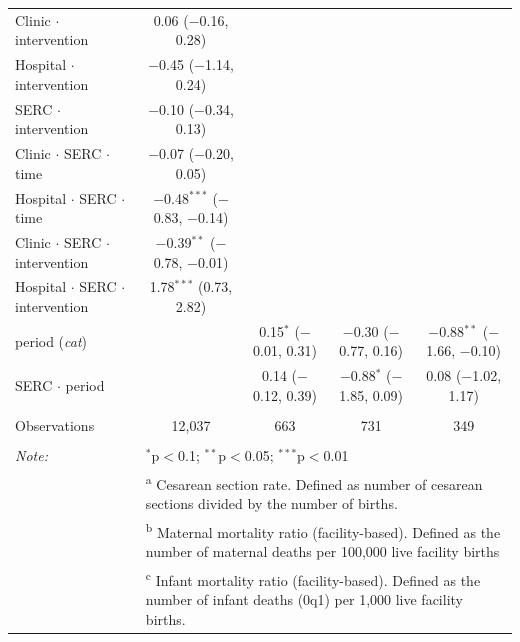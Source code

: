 \documentclass[10pt]{article}
\begin{document}
\begin{table}
\begin{tabular}{@{\extracolsep{0pt}}lcccc}
  Clinic $\cdot$ intervention & 0.06 ($-$0.16, 0.28) &  &  &  \\ 
  Hospital $\cdot$ intervention & $-$0.45 ($-$1.14, 0.24) &  &  &  \\ 
  SERC $\cdot$ intervention & $-$0.10 ($-$0.34, 0.13) &  &  &  \\ 
  Clinic $\cdot$ SERC $\cdot$ time & $-$0.07 ($-$0.20, 0.05) &  &  &  \\ 
  Hospital $\cdot$ SERC $\cdot$ time & $-$0.48$^{***}$ ($-$0.83, $-$0.14) &  &  &  \\ 
  Clinic $\cdot$ SERC $\cdot$ intervention & $-$0.39$^{**}$ ($-$0.78, $-$0.01) &  &  &  \\ 
  Hospital $\cdot$ SERC $\cdot$ intervention & 1.78$^{***}$ (0.73, 2.82) &  &  &  \\ 
  period (\textit{cat}) &  & 0.15$^{*}$ ($-$0.01, 0.31) & $-$0.30 ($-$0.77, 0.16) & $-$0.88$^{**}$ ($-$1.66, $-$0.10) \\ 
  SERC $\cdot$ period &  & 0.14 ($-$0.12, 0.39) & $-$0.88$^{*}$ ($-$1.85, 0.09) & 0.08 ($-$1.02, 1.17) \\ 
 \hline \\[-1.8ex] 
Observations & 12,037 & 663 & 731 & 349 \\ 
\hline 
\hline \\[-1.8ex] 
\textit{Note:}  & \multicolumn{4}{l}{$^{*}$p$<$0.1; $^{**}$p$<$0.05; $^{***}$p$<$0.01} \\ 
 & \multicolumn{4}{l}{\textsuperscript{a} Cesarean section rate. Defined as number of cesarean sections divided by the number of births.} \\ 
 & \multicolumn{4}{l}{ \textsuperscript{b} Maternal mortality ratio (facility-based). Defined as the number of maternal deaths per 100,000 live facility births} \\ 
 & \multicolumn{4}{l}{\textsuperscript{c} Infant mortality ratio (facility-based). Defined as the number of infant deaths (0q1) per 1,000 live facility births.} \\ 
\end{tabular} 
\end{table}
\end{document}
